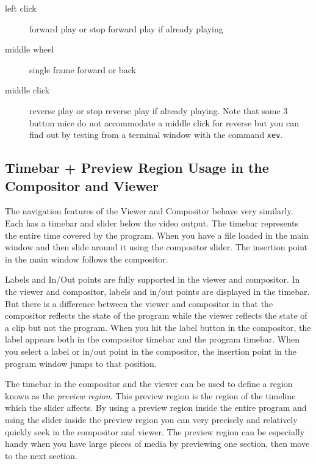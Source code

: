 \begin{description}
    \item[left click]          forward play or stop forward play if already playing
    \item[middle wheel]  single frame forward or back
    \item[middle click]    reverse play or stop reverse play if already playing. 
        Note that some 3 button mice do not accommodate a middle click for reverse but you can find out by testing from a terminal window with the command \texttt{xev}.
\end{description}

\subsection{Timebar + Preview Region Usage in the Compositor and Viewer}%
\label{sub:timebar_preview_region_usage_in_the_compositor_and_viewer}

The navigation features of the Viewer and Compositor behave very similarly. 
Each has a timebar and slider below the video output. 
The timebar represents the entire time covered by the program.   
When you have a file loaded in the main window and then slide around it using the compositor slider. The insertion point in the main window follows the compositor. 

Labels and In/Out points are fully supported in the viewer and compositor.  
In the viewer and compositor, labels and in/out points are displayed in the timebar.  
But there is a difference between the viewer and compositor in that the compositor reflects the state of the program while the viewer reflects the state of a clip but not the program. 
When you hit the label button in the compositor, the label appears both in the compositor timebar and the program timebar. 
When you select a label or in/out point in the compositor, the insertion point in the program window jumps to that position. 

The timebar in the compositor and the viewer can be used to define a region known as the \textit{preview region}.  
This preview region is the region of the timeline which the slider affects.  
By using a preview region inside the entire program and using the slider inside the preview region you can very precisely and relatively quickly seek in the compositor and viewer.  
The preview region can be especially handy when you have large pieces of media by previewing one section, then move to the next section.  

